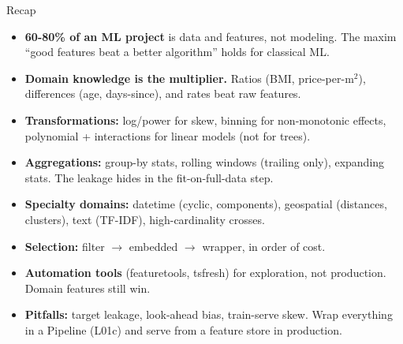 \documentclass[aspectratio=169]{beamer}
\begin{document}
\begin{frame}{Recap}
  \begin{itemize}\small
    \item \textbf{60-80\% of an ML project} is data and features, not modeling. The maxim ``good features beat a better algorithm'' holds for classical ML.
    \item \textbf{Domain knowledge is the multiplier.} Ratios (BMI, price-per-m$^2$), differences (age, days-since), and rates beat raw features.
    \item \textbf{Transformations:} log/power for skew, binning for non-monotonic effects, polynomial + interactions for linear models (not for trees).
    \item \textbf{Aggregations:} group-by stats, rolling windows (trailing only), expanding stats. The leakage hides in the fit-on-full-data step.
    \item \textbf{Specialty domains:} datetime (cyclic, components), geospatial (distances, clusters), text (TF-IDF), high-cardinality crosses.
    \item \textbf{Selection:} filter $\to$ embedded $\to$ wrapper, in order of cost.
    \item \textbf{Automation tools} (featuretools, tsfresh) for exploration, not production. Domain features still win.
    \item \textbf{Pitfalls:} target leakage, look-ahead bias, train-serve skew. Wrap everything in a Pipeline (L01c) and serve from a feature store in production.
  \end{itemize}
\end{frame}
\end{document}
